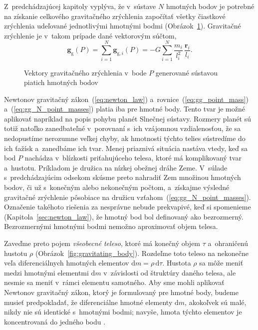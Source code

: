 \documentclass[a4paper, 12pt]{book}
\newcommand{\diff}{\mathrm d}
\newcommand{\gidx}{\mathrm g}
\let\vec\mathbf
\begin{document}
Z~predchádzajúcej kapitoly vyplýva, že v~sústave $N$ hmotných bodov je potrebné
na získanie celkového gravitačného zrýchlenia započítať všetky čiastkové
zrýchlenia udeľované jednotlivými hmotnými bodmi
(Obrázok~\ref{fig:gg_n_point_masses}).  Gravitačné zrýchlenie je v~takom
prípade dané vektorovým súčtom,
%
\begin{equation}
\label{eq:gg_N_point_masses}
\vec g_\gidx(P) = \sum_{i = 1}^{N}\vec g_{\gidx,i}(P) = -G \sum_{i = 1}^{N}
\frac{m_i}{l_i^2} \, \frac{\vec r_i}{l_i}{.}
\end{equation}

\begin{figure}[b]
\centering

\caption{Vektory gravitačného zrýchlenia v~bode $P$ generované sústavou piatich
hmotných bodov}
\label{fig:gg_n_point_masses}
\end{figure}

Newtonov gravitačný zákon~(\ref{eq:newton_law})
a~rovnice~(\ref{eq:gg_point_mass})
a~(\ref{eq:gg_N_point_masses}) platia iba pre hmotné body.
Tento tvar je možné aplikovať napríklad na popis pohybu planét Slnečnej
sústavy.  Rozmery planét sú totiž natoľko zanedbateľné v~porovnaní s~ich
vzájomnou vzdialenosťou, že sa nedopustíme nerozumne veľkej chyby, ak hmotnosti
týchto telies sústredíme do ich ťažísk a~zanedbáme ich tvar.  Menej priaznivá
situácia nastáva vtedy, keď sa bod $P$ nachádza v~blízkosti priťahujúceho
telesa, ktoré má komplikovaný tvar a~hustotu.  Príkladom je družica na nízkej
obežnej dráhe Zeme.  V~súlade s~predchádzajúcim odsekom skúsme preto nahradiť
Zem množinou hmotných bodov, či už s~konečným alebo nekonečným počtom,
a~získajme výsledné gravitačné zrýchlenie pôsobiace na družicu
vzťahom~(\ref{eq:gg_N_point_masses}).  Označenie takéhoto
riešenia za nesprávne nebude prekvapivé, keď si spomenieme
(Kapitola~\ref{sec:newton_law}), že hmotný bod bol definovaný
ako bezrozmerný.  Bezrozmernými hmotnými bodmi nemožno aproximovať objem
telesa.

Zaveďme preto pojem \emph{všeobecné teleso}, ktoré má konečný objem $\tau$
a~ohraničenú hustotu $\rho$ (Obrázok~\ref{fig:gravitating_body}).  Rozdeľme
toto teleso na nekonečne veľa diferenciálnych hmotných elementov $\diff
m = \rho \, \diff \tau$.  Hustota $\rho$ sa môže meniť medzi hmotnými elementmi
$\diff m$ v~závislosti od štruktúry daného telesa, ale nesmie sa meniť v~rámci
elementu samotného.  Aby sme mohli aplikovať Newtonov gravitačný zákon, ktorý
je formulovaný pre hmotné body, budeme musieť predpokladať, že diferenciálne
hmotné elementy $\diff m$, akokoľvek sú malé, nikdy nie sú identické s~hmotnými
bodmi; navyše, hmota týchto elementov je koncentrovaná do jedného bodu
\citep{Kellogg1967}.
\end{document}
